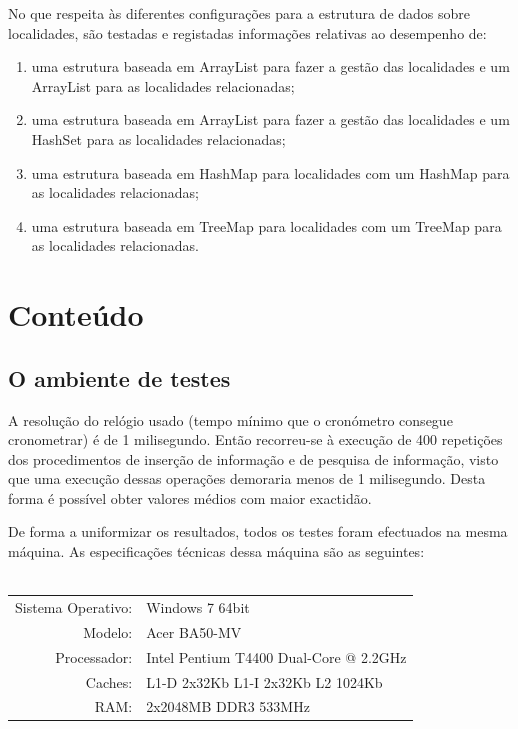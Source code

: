 \documentclass[a5paper,twocolumn, 11pt]{article}
\begin{document}
No que respeita às diferentes configurações para a estrutura de dados sobre localidades, são testadas e registadas informações relativas ao desempenho de:
\begin{enumerate}
    \item{uma estrutura baseada em ArrayList para fazer a gestão das localidades e um ArrayList para as localidades relacionadas;}
    \item{uma estrutura baseada em ArrayList para fazer a gestão das localidades e um HashSet para as localidades relacionadas;}
    \item{uma estrutura baseada em HashMap para localidades com um HashMap
para as localidades relacionadas;}
    \item{uma estrutura baseada em TreeMap para localidades com um TreeMap
para as localidades relacionadas.}
\end{enumerate}
\clearpage
\newpage
\section{Conteúdo}
\subsection{O ambiente de testes}

A resolução do relógio usado (tempo mínimo que o cronómetro consegue cronometrar) é de 1 milisegundo. Então recorreu-se à execução de 400 repetições dos procedimentos de inserção de informação e de pesquisa de informação, visto que uma execução dessas operações demoraria menos de 1 milisegundo. Desta forma é possível obter valores médios com maior exactidão.

De forma a uniformizar os resultados, todos os testes foram efectuados na mesma máquina. As especificações técnicas dessa máquina são as seguintes:\\
\\
\begin{tabular}{ | r  | p{2.8cm} | }
    \hline
    Sistema Operativo: & Windows 7 64bit \\
    Modelo: & Acer BA50-MV \\
    Processador: & \vbox{Intel Pentium} T4400 \vbox{Dual-Core} @ 2.2GHz \\
    Caches: & \vbox{L1-D 2x32Kb}
    \vbox{L1-I 2x32Kb}
    \vbox{L2 1024Kb} \\
    RAM: & 2x2048MB DDR3 533MHz\\ \hline
\end{tabular}\\
\\
\end{document}

